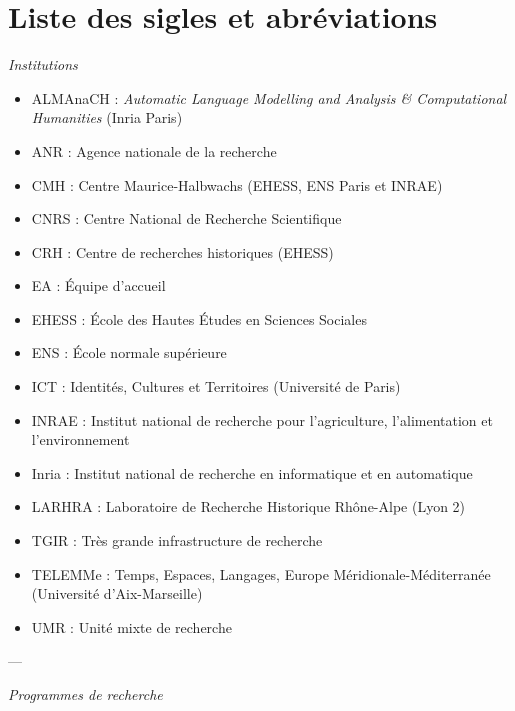 \chapter*{Liste des sigles et abréviations}

\begin{center}
\textit{Institutions}
\end{center} 

\begin{itemize}
    \item ALMAnaCH : \textit{Automatic Language Modelling and Analysis \& Computational Humanities} (Inria Paris)
    \item ANR : Agence nationale de la recherche
    \item CMH : Centre Maurice-Halbwachs (EHESS, ENS Paris et INRAE)
    \item CNRS : Centre National de Recherche Scientifique
    \item CRH : Centre de recherches historiques (EHESS)
    \item EA : Équipe d'accueil
    \item EHESS : École des Hautes Études en Sciences Sociales
    \item ENS : École normale supérieure
    \item ICT : Identités, Cultures et Territoires (Université de Paris)
    \item INRAE : Institut national de recherche pour l'agriculture, l'alimentation et l'environnement
    \item Inria : Institut national de recherche en informatique et en automatique
    \item LARHRA : Laboratoire de Recherche Historique Rhône-Alpe (Lyon 2)
    \item TGIR : Très grande infrastructure de recherche
    \item TELEMMe : Temps, Espaces, Langages, Europe Méridionale-Méditerranée (Université d’Aix-Marseille)
    \item UMR : Unité mixte de recherche
\end{itemize}

\bigbreak

\begin{center}---

\bigbreak

\textit{Programmes de recherche}
\end{center} 

